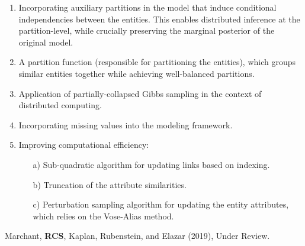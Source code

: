 \documentclass[compress]{beamer}
\newcommand{\1}[1]{\mathbb{I}\!\left[#1\right]} %
\theoremstyle{plain}
\begin{document}
{\begin{enumerate}
\item Incorporating auxiliary partitions in the model that
induce conditional independencies between the entities. This enables distributed inference at the partition-level, while crucially preserving the marginal posterior of the original model. 
\item A partition function (responsible for partitioning the entities), which groups similar entities together while achieving well-balanced partitions.
\item Application of partially-collapsed Gibbs sampling in the context of distributed computing.
\item Incorporating missing values into the modeling framework. 
\item Improving computational efficiency:
\begin{enumerate}
\item[a)] Sub-quadratic algorithm for updating links based on indexing.
\item[b)] Truncation of the attribute similarities.
\item[c)] Perturbation sampling algorithm for updating the entity attributes, which relies on the Vose-Alias method.
\end{enumerate}
\end{enumerate}

Marchant, \textbf{RCS}, Kaplan, Rubenstein, and Elazar (2019), Under Review.

}
\end{document}
